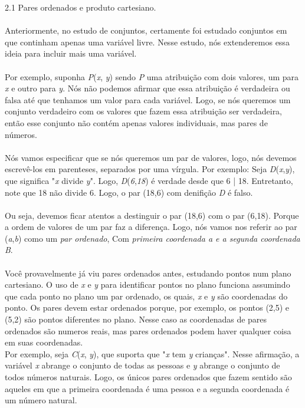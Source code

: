 
\large 2.1 Pares ordenados e produto cartesiano.
\\
\\


Anteriormente, no estudo de conjuntos, certamente foi estudado conjuntos em que continham apenas uma variável livre.
Nesse estudo, nós extenderemos essa ideia para incluir mais uma variável.
\\
\\
Por exemplo, suponha \textit{P}(\textit{x}, \textit{y}) sendo \textit{P} uma atribuição com dois valores, um para \textit{x} 
e outro para \textit{y}. Nós não podemos afirmar que essa atribuição é verdadeira ou falsa até que tenhamos um valor para cada
variável. Logo, se nós queremos um conjunto verdadeiro com os valores que fazem essa atribuição ser verdadeira, então esse 
conjunto não contém apenas valores individuais, mas pares de números.
\\
\\
Nós vamos especificar que se nós queremos um par de valores, logo, nós devemos escrevê-los em parenteses, separados por uma 
vírgula. Por exemplo: Seja \textit{D}(\textit{x},\textit{y}), que significa "\textit{x} divide \textit{y}". Logo,
\textit{D}(\textit{6},\textit{18}) é verdade desde que 6 | 18. Entretanto, note que 18 não divide 6. Logo, o par (18,6) 
com denifição \textit{D} é falso.
\\
\\
Ou seja, devemos ficar atentos a destinguir o par (18,6) com o par (6,18). Porque a ordem de valores de um par faz a diferença.
Logo, nós vamos nos referir ao par (\textit{a},\textit{b}) como um \textit{par ordenado}, Com \textit{primeira coordenada a e 
a segunda coordenada B}.
\\
\\
Você provavelmente já viu pares ordenados antes, estudando pontos num plano cartesiano. O uso de \textit{x} e \textit{y} para 
identificar pontos no plano funciona assumindo que cada ponto no plano um par ordenado, os quais, \textit{x} e \textit{y} são
coordenadas do ponto. Os pares devem estar ordenados porque, por exemplo, os pontos (2,5) e (5,2) são pontos diferentes no plano.
Nesse caso as coordenadas de pares ordenados são numeros reais, mas pares ordenados podem haver qualquer coisa em suas coordenadas.
\\
Por exemplo, seja \textit{C}(\textit{x}, \textit{y}), que suporta que "\textit{x} tem \textit{y} crianças". Nesse afirmação, a 
variável \textit{x} abrange o conjunto de todas as pessoas e \textit{y} abrange o conjunto de todos números naturais. Logo, os 
únicos pares ordenados que fazem sentido são aqueles em que a primeira coordenada é uma pessoa e a segunda coordenada é um número
natural.
\\


